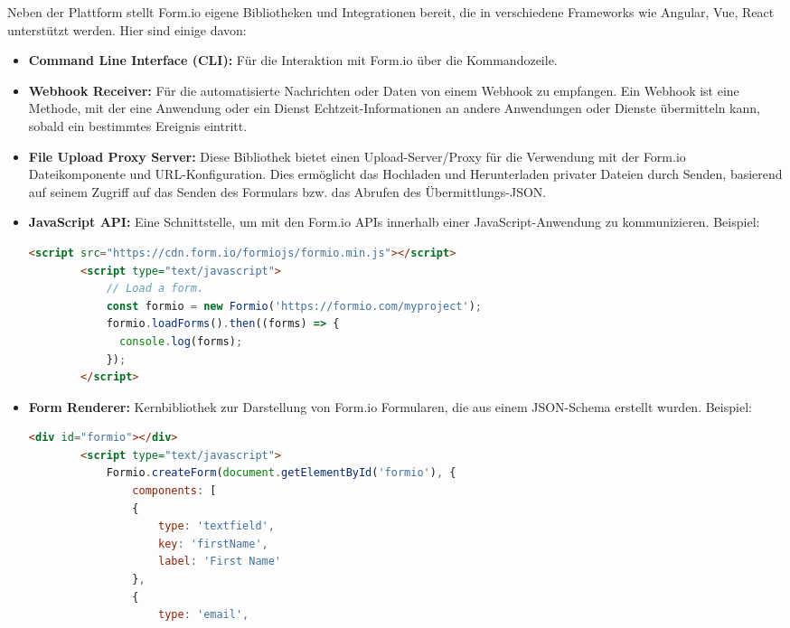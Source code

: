 Neben der Plattform stellt Form.io eigene Bibliotheken und Integrationen bereit, die in verschiedene Frameworks wie Angular, Vue, React unterstützt werden. Hier sind einige davon:
\begin{itemize}
    \item \textbf{Command Line Interface (CLI):} Für die Interaktion mit Form.io über die Kommandozeile.
    \item \textbf{Webhook Receiver:} Für die automatisierte Nachrichten oder Daten von einem Webhook zu empfangen. Ein Webhook ist eine Methode, mit der eine Anwendung oder ein Dienst Echtzeit-Informationen an andere Anwendungen oder Dienste übermitteln kann, sobald ein bestimmtes Ereignis eintritt.
    \item \textbf{File Upload Proxy Server:} Diese Bibliothek bietet einen Upload-Server/Proxy für die Verwendung mit der Form.io Dateikomponente und URL-Konfiguration. Dies ermöglicht das Hochladen und Herunterladen privater Dateien durch Senden, basierend auf seinem Zugriff auf das Senden des Formulars bzw. das Abrufen des Übermittlungs-JSON. 
    \item \textbf{JavaScript API:} Eine Schnittstelle, um mit den Form.io APIs innerhalb einer JavaScript-Anwendung zu kommunizieren. Beispiel:
    \begin{adjustwidth}{-5em}{0pt}
    \begin{lstlisting}[language=HTML]
        <script src="https://cdn.form.io/formiojs/formio.min.js"></script>
        <script type="text/javascript">
            // Load a form.
            const formio = new Formio('https://formio.com/myproject');
            formio.loadForms().then((forms) => {
              console.log(forms);
            });
        </script>
    \end{lstlisting}
    \end{adjustwidth}
    \item \textbf{Form Renderer:} Kernbibliothek zur Darstellung von Form.io Formularen, die aus einem JSON-Schema erstellt wurden. Beispiel:
    \begin{adjustwidth}{-5em}{0pt}
    \begin{lstlisting}[language=HTML]
        <div id="formio"></div>
        <script type="text/javascript">
            Formio.createForm(document.getElementById('formio'), {
                components: [
                {
                    type: 'textfield',
                    key: 'firstName',
                    label: 'First Name'
                },
                {
                    type: 'email',

\end{lstlisting}
\end{adjustwidth}
\end{itemize}
